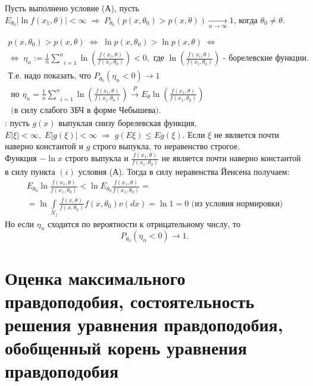 \begin{theorem}\label{lec:2/the:1}
	Пусть выполнено условие (А), пусть $E_{\theta_0} |\ln f(x_1, \theta)| < \infty \; \Rightarrow \; P_{\theta_0} (p(x, \theta_0) > p(x, \theta)) \xrightarrow[n \to \infty]{} 1$, когда $\theta_0 \not = \theta$.
\end{theorem}
\begin{Proof}
$$\begin{gathered}
	p(x, \theta_0) > p(x, \theta) \; \Leftrightarrow \; \ln p(x, \theta_0) > \ln p(x, \theta) \; \Leftrightarrow \\
	\Leftrightarrow \; \eta_n := \frac{1}{n} \underset{i=1}{\overset{n}{\sum}} \ln \left( \frac{f(x_i, \theta)}{f(x_i, \theta_0)} \right) < 0, \text{ где } \ln \left( \frac{f(x_i, \theta)}{f(x_i, \theta_0)} \right) \text{ - борелевские функции.}\\
	\text{Т.е. надо показать, что } P_{\theta_0} (\eta_n < 0) \to 1 \\
	\text{ но } \eta_n = \frac{1}{n} \underset{i=1}{\overset{n}{\sum}}\ln \left( \frac{f(x_i, \theta)}{f(x_i, \theta_0)} \right) \xrightarrow[]{P} E_{\theta} \ln \left( \frac{f(x_1, \theta)}{f(x_1, \theta_0)} \right) \\ 
	\text{ (в силу слабого ЗБЧ в форме Чебышева)}.
\end{gathered}$$
: пусть $g(x)$ выпуклая снизу борелевская функция, $E|\xi| < \infty, \; E|g(\xi)| < \infty \; \Rightarrow \; g(E \xi) \le E g(\xi)$. Если $\xi$ не является почти наверно константой и $g$ строго выпукла, то неравенство строгое.\\

Функция $-\ln x$ строго выпукла и $\frac{f(x_1, \theta)}{f(x_1, \theta_0)}$ не является почти наверно константой в силу пункта $(i)$ условия (А). Тогда в силу неравенства Йенсена получаем:
$$\begin{gathered}
	E_{\theta_0} \ln \frac{f(x_1, \theta)}{f(x_1, \theta_0)} < \ln E_{\theta_0} \frac{f(x_1, \theta)}{f(x_1, \theta_0)} = \\
	= \ln \underset{N_f}{\overset{}{\int}}\frac{f(x, \theta)}{f(x, \theta_0)} f(x, \theta_0) \nu(dx) = \ln 1 = 0 \text{ (из условия нормировки)}
\end{gathered}$$
Но если $\eta_n$ сходится по вероятности к отрицательному числу, то 
$$P_{\theta_0} (\eta_n < 0) \to 1.$$
\end{Proof}

\section{Оценка максимального правдоподобия, состоятельность решения уравнения правдоподобия, обобщенный корень уравнения правдоподобия}\label{lec:2/sec:3}

